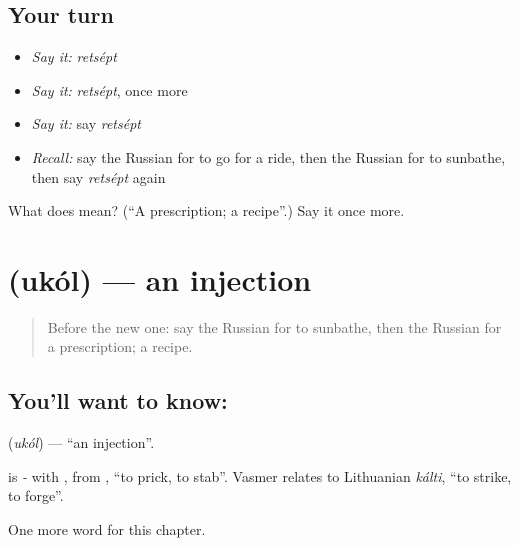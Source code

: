 \subsection*{Your turn}
\begin{itemize}
\raggedright
  \item \emph{Say it:} \emph{retsépt}
  \item \emph{Say it:} \emph{retsépt}, once more
  \item \emph{Say it:} say \emph{retsépt}
  \item \emph{Recall:} say the Russian for to go for a ride, then the Russian for to sunbathe, then say \emph{retsépt} again
\end{itemize}

\begin{tcolorbox}[breakable,colback=teal!4,colframe=teal!35!black,title={Before you move on}]
What does  mean? (\textquotedblleft{}A prescription; a recipe\textquotedblright{}.) Say it once more.
\end{tcolorbox}
\section[\texorpdfstring{\ru{укол} (ukól)}{укол (ukól)}]{ (ukól) — an injection}

\label{lesson:RU-C179-ukol}



\begin{quote}
Before the new one: say the Russian for to sunbathe, then the Russian for a prescription; a recipe.
\end{quote}

\subsection*{You'll want to know: }
\textbf{} (\emph{ukól}) — \textquotedblleft{}an injection\textquotedblright{}.

\begin{cousinweb}
\textbf{} is \emph{-} with \emph{}, from \emph{}, \textquotedblleft{}to prick, to stab\textquotedblright{}. Vasmer relates \emph{} to Lithuanian \emph{kálti}, \textquotedblleft{}to strike, to forge\textquotedblright{}.
\end{cousinweb}

\begin{grammarlens}[title={What you've built}]
One more word for this chapter.
\end{grammarlens}

